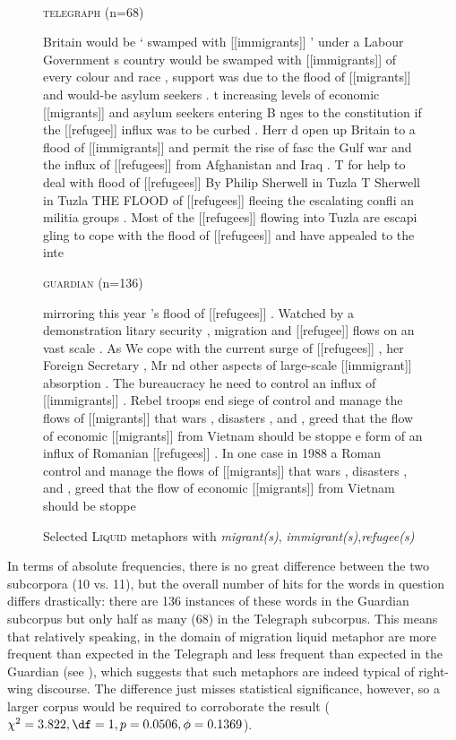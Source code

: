\begin{figure}
\caption{Selected \textsc{Liquid} metaphors with \textit{migrant(s)}, \textit{immigrant(s)},\textit{refugee(s)}}
\label{fig:liquidrefugee}
\hrulefill \\
\textsc{telegraph} (n=68)
\begin{fitverb}
Britain would be ` swamped with [[immigrants]] ' under a Labour Government
s country would be swamped with [[immigrants]] of every colour and race ,
support was due to the flood of [[migrants]] and would-be asylum seekers .
t increasing levels of economic [[migrants]] and asylum seekers entering B
nges to the constitution if the [[refugee]] influx was to be curbed . Herr
d open up Britain to a flood of [[immigrants]] and permit the rise of fasc
 the Gulf war and the influx of [[refugees]] from Afghanistan and Iraq . T
 for help to deal with flood of [[refugees]] By Philip Sherwell in Tuzla T
 Sherwell in Tuzla THE FLOOD of [[refugees]] fleeing the escalating confli
an militia groups . Most of the [[refugees]] flowing into Tuzla are escapi
gling to cope with the flood of [[refugees]] and have appealed to the inte
\end{fitverb}
\textsc{guardian} (n=136)
\begin{fitverb}
mirroring this year 's flood of [[refugees]] . Watched by a demonstration
litary security , migration and [[refugee]] flows on an vast scale . As We
 cope with the current surge of [[refugees]] , her Foreign Secretary , Mr
nd other aspects of large-scale [[immigrant]] absorption . The bureaucracy
he need to control an influx of [[immigrants]] . Rebel troops end siege of
control and manage the flows of [[migrants]] that wars , disasters , and ,
greed that the flow of economic [[migrants]] from Vietnam should be stoppe
e form of an influx of Romanian [[refugees]] . In one case in 1988 a Roman
control and manage the flows of [[migrants]] that wars , disasters , and ,
greed that the flow of economic [[migrants]] from Vietnam should be stoppe
\end{fitverb}
\hrulefill
\end{figure}

In terms of absolute frequencies,  there is no great difference between the two subcorpora (10 vs. 11), but the overall number of hits for the words in question differs drastically: there are 136 instances of these words in the Guardian subcorpus but only half as many (68) in the Telegraph subcorpus. This means that relatively speaking, in the domain of migration liquid metaphor  are more frequent than expected  in the Telegraph and less frequent than expected in the Guardian (see ), which suggests that such metaphors are indeed typical of right\hyp{}wing discourse. The difference just misses statistical significance, however, so a larger  corpus would be required to corroborate the result ($\chi^2 = 3.822, \df = 1, p = 0.0506, \phi = 0.1369$).

